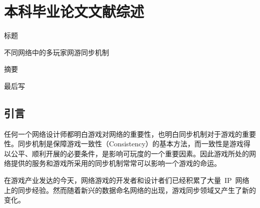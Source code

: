 \chapter{本科毕业论文文献综述}



%


\newcommand{\csa}{客户~\slash~服务器架构}
\newcommand{\pa}{对等体架构}
\newcommand{\da}{分布式架构}
\newcommand{\ma}{镜像服务器架构}
\newcommand{\ioc}{I{\slash}O\_C}
\newcommand{\gss}{GSS}


\heiti
标题

\songti
不同网络中的多玩家网游同步机制

\heiti
摘要

\songti
最后写

\section{引言}
任何一个网络设计师都明白游戏对网络的重要性，也明白同步机制对于游戏的重要性。同步机制是保障游戏一致性（Consistency）的基本方法，而一致性是游戏得以公平、顺利开展的必要条件，是影响可玩度的一个重要因素。因此游戏所处的网络提供的服务和游戏所采用的同步机制常常可以影响一个游戏的命运。

在游戏产业发达的今天，网络游戏的开发者和设计者们已经积累了大量~IP~网络上的同步经验。然而随着新兴的数据命名网络的出现，游戏同步领域又产生了新的变化。

